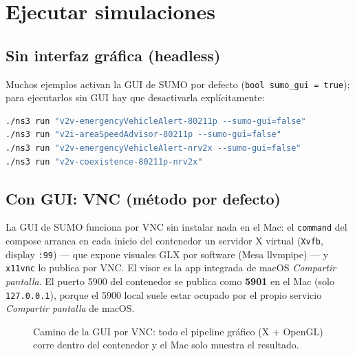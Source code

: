 \documentclass[11pt,a4paper]{article}
\begin{document}
\section{Ejecutar simulaciones}

\subsection{Sin interfaz gr\'afica (headless)}

Muchos ejemplos activan la GUI de SUMO por defecto
(\texttt{bool sumo\_gui = true}); para ejecutarlos sin GUI hay que
desactivarla expl\'icitamente:

\begin{lstlisting}[language=bash]
./ns3 run "v2v-emergencyVehicleAlert-80211p --sumo-gui=false"
./ns3 run "v2i-areaSpeedAdvisor-80211p --sumo-gui=false"
./ns3 run "v2v-emergencyVehicleAlert-nrv2x --sumo-gui=false"
./ns3 run "v2v-coexistence-80211p-nrv2x"
\end{lstlisting}

\subsection{Con GUI: VNC (m\'etodo por defecto)}
\label{sec:vnc}

La GUI de SUMO funciona por VNC sin instalar nada en el Mac: el
\texttt{command} del compose arranca en cada inicio del contenedor un
servidor X virtual (\texttt{Xvfb}, display \texttt{:99}) --- que expone
visuales GLX por software (Mesa llvmpipe) --- y \texttt{x11vnc} lo publica
por VNC. El visor es la app integrada de macOS \emph{Compartir pantalla}.
El puerto 5900 del contenedor se publica como \textbf{5901} en el Mac (solo
\texttt{127.0.0.1}), porque el 5900 local suele estar ocupado por el propio
servicio \emph{Compartir pantalla} de macOS.

\begin{figure}[h!]
\centering
{}
\caption{Camino de la GUI por VNC: todo el pipeline gr\'afico (X + OpenGL)
corre dentro del contenedor y el Mac solo muestra el resultado.}
\label{fig:vncpath}
\end{figure}
\end{document}
